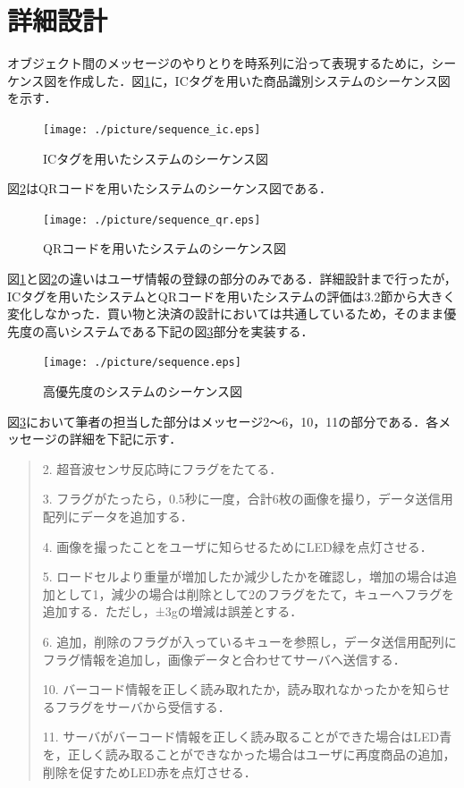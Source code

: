 

\section{詳細設計}

オブジェクト間のメッセージのやりとりを時系列に沿って表現するために，シーケンス図を作成した．図\ref{sequence_ic}に，ICタグを用いた商品識別システムのシーケンス図を示す．

\begin{figure}[htbp]
\centering
\texttt{[image: ./picture/sequence\_ic.eps]}
\caption{ICタグを用いたシステムのシーケンス図}
\label{sequence_ic}
\end{figure}


図\ref{sequence_qr}はQRコードを用いたシステムのシーケンス図である．


\begin{figure}[htbp]
\centering
\texttt{[image: ./picture/sequence\_qr.eps]}
\caption{QRコードを用いたシステムのシーケンス図}
\label{sequence_qr}
\end{figure}


図\ref{sequence_ic}と図\ref{sequence_qr}の違いはユーザ情報の登録の部分のみである．詳細設計まで行ったが，ICタグを用いたシステムとQRコードを用いたシステムの評価は3.2節から大きく変化しなかった．買い物と決済の設計においては共通しているため，そのまま優先度の高いシステムである下記の図\ref{sequence}部分を実装する．



\begin{figure}[htbp]
\centering
\texttt{[image: ./picture/sequence.eps]}
\caption{高優先度のシステムのシーケンス図}
\label{sequence}
\end{figure}


図\ref{sequence}において筆者の担当した部分はメッセージ2～6，10，11の部分である．各メッセージの詳細を下記に示す．


\begin{quote}
2. 超音波センサ反応時にフラグをたてる．

3. フラグがたったら，0.5秒に一度，合計6枚の画像を撮り，データ送信用配列にデータを追加する．

4. 画像を撮ったことをユーザに知らせるためにLED緑を点灯させる．

5. ロードセルより重量が増加したか減少したかを確認し，増加の場合は追加として1，減少の場合は削除として2のフラグをたて，キューへフラグを追加する．ただし，±3gの増減は誤差とする．

6. 追加，削除のフラグが入っているキューを参照し，データ送信用配列にフラグ情報を追加し，画像データと合わせてサーバへ送信する．

10. バーコード情報を正しく読み取れたか，読み取れなかったかを知らせるフラグをサーバから受信する．

11. サーバがバーコード情報を正しく読み取ることができた場合はLED青を，正しく読み取ることができなかった場合はユーザに再度商品の追加，削除を促すためLED赤を点灯させる．
\end{quote}

